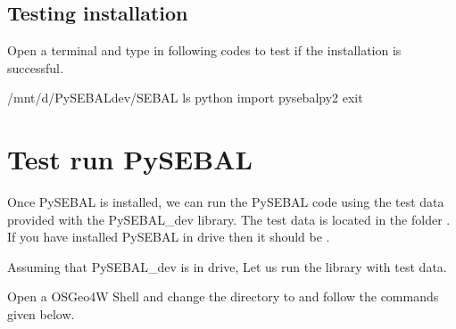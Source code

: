 \documentclass[letterpaper,10pt,english]{sphinxmanual}
\begin{document}
\subsection{Testing installation}
\label{\detokenize{installation:testing-installation}}
Open a terminal and type in following codes to test if the installation is successful.

\begin{sphinxVerbatim}[commandchars=\\\{\},numbers=left,firstnumber=1,stepnumber=1]
 /mnt/d/PySEBAL\PYGZus{}dev/SEBAL
ls
python
import pysebal\PYGZus{}py2
exit
\end{sphinxVerbatim}


\section{Test run PySEBAL}
\label{\detokenize{installation:test-run-pysebal}}
Once PySEBAL is installed, we can run the PySEBAL code using the test data provided with the PySEBAL\_dev library. The test data is located in the folder . If you have installed PySEBAL in  drive then it should be .

\begin{DUlineblock}{0em}
\item[] Assuming that PySEBAL\_dev is in  drive, Let us run the library with test data.
\end{DUlineblock}

\begin{DUlineblock}{0em}
\item[] Open a OSGeo4W Shell and change the directory to  and follow the commands given below.
\end{DUlineblock}
\end{document}

